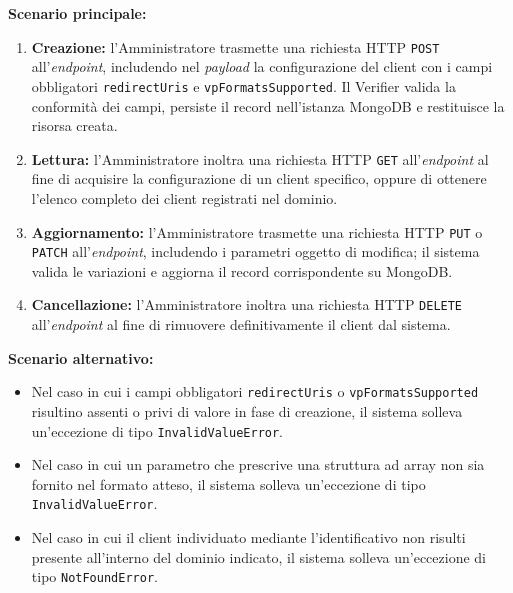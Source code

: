 \noindent\textbf{Scenario principale:}
\begin{enumerate}
    \item \textbf{Creazione:} l'Amministratore trasmette una richiesta HTTP \texttt{POST} all'\textit{endpoint}, includendo nel \textit{payload} la configurazione del client con i campi obbligatori \texttt{redirectUris} e \texttt{vpFormatsSupported}. Il Verifier valida la conformità dei campi, persiste il record nell'istanza MongoDB e restituisce la risorsa creata.
    \item \textbf{Lettura:} l'Amministratore inoltra una richiesta HTTP \texttt{GET} all'\textit{endpoint} al fine di acquisire la configurazione di un client specifico, oppure di ottenere l'elenco completo dei client registrati nel dominio.
    \item \textbf{Aggiornamento:} l'Amministratore trasmette una richiesta HTTP \texttt{PUT} o \texttt{PATCH} all'\textit{endpoint}, includendo i parametri oggetto di modifica; il sistema valida le variazioni e aggiorna il record corrispondente su MongoDB.
    \item \textbf{Cancellazione:} l'Amministratore inoltra una richiesta HTTP \texttt{DELETE} all'\textit{endpoint} al fine di rimuovere definitivamente il client dal sistema.
\end{enumerate}

\noindent\textbf{Scenario alternativo:}
\begin{itemize}
    \item Nel caso in cui i campi obbligatori \texttt{redirectUris} o \texttt{vpFormatsSupported} risultino assenti o privi di valore in fase di creazione, il sistema solleva un'eccezione di tipo \texttt{InvalidValueError}.
    \item Nel caso in cui un parametro che prescrive una struttura ad array non sia fornito nel formato atteso, il sistema solleva un'eccezione di tipo \texttt{InvalidValueError}.
    \item Nel caso in cui il client individuato mediante l'identificativo non risulti presente all'interno del dominio indicato, il sistema solleva un'eccezione di tipo \texttt{NotFoundError}.
\end{itemize}
